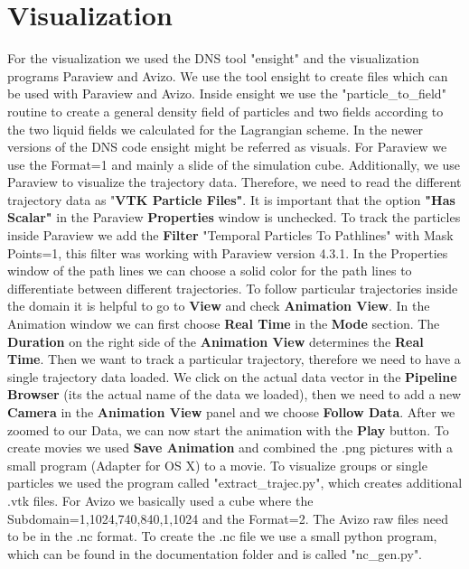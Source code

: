 \documentclass[12pt]{article}
\begin{document}
\section{Visualization}
\label{sec:visualization}
For the visualization we used the DNS tool "ensight" and the visualization programs Paraview and Avizo. We use the tool ensight to create files which can be used with Paraview and Avizo. Inside ensight we use the "particle\_to\_field" routine to create a general density field of particles and two fields according to the two liquid fields we calculated for the Lagrangian scheme. In the newer versions of the DNS code ensight might be referred as visuals. \newline
For Paraview we use the Format=1 and mainly a slide of the simulation cube. Additionally, we use Paraview to visualize the trajectory data. Therefore, we need to read the different trajectory data as "\textbf{VTK Particle Files"}. It is important that the option \textbf{"Has Scalar"} in the Paraview \textbf{Properties} window is unchecked. To track the particles inside Paraview we add the \textbf{Filter} "Temporal Particles To Pathlines" with Mask Points=1, this filter was working with Paraview version 4.3.1. In the Properties window of the path lines we can choose a solid color for the path lines to differentiate between different trajectories. To follow particular trajectories inside the domain it is helpful to go to \textbf{View} and check \textbf{Animation View}. In the Animation window we can first choose \textbf{Real Time} in the \textbf{Mode} section. The \textbf{Duration} on the right side of the \textbf{Animation View} determines the \textbf{Real Time}. Then we want to track a particular trajectory, therefore we need to have a single trajectory data loaded. We click on the actual data vector in the \textbf{Pipeline Browser} (its the actual name of the data we loaded), then we need to add a new \textbf{Camera} in the \textbf{Animation View} panel and we choose \textbf{Follow Data}. After we zoomed to our Data, we can now start the animation with the \textbf{Play} button. To create movies we used \textbf{Save Animation} and combined the .png pictures with a small program (Adapter for OS X) to a movie. To visualize groups or single particles we used the program called "extract\_trajec.py", which creates additional .vtk files. \newline
For Avizo we basically used a cube where the Subdomain=1,1024,740,840,1,1024 and the Format=2. The Avizo raw files need to be in the .nc format. To create the .nc file we use a small python program, which can be found in the documentation folder and is called "nc\_gen.py".
\end{document}
